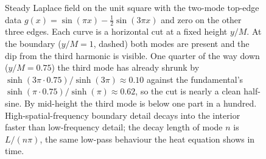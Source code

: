 \begin{figure}[htbp]
\centering
{}
\caption[Two-mode Laplace boundary penetration]{Steady Laplace field
on the unit square with the two-mode top-edge data $g(x) = \sin(\pi
x) - \tfrac{1}{2}\sin(3\pi x)$ and zero on the other three edges.
Each curve is a horizontal cut at a fixed height $y/M$. At the
boundary ($y/M = 1$, dashed) both modes are present and the dip from
the third harmonic is visible. One quarter of the way down ($y/M =
0.75$) the third mode has already shrunk by $\sinh(3\pi\cdot
0.75)/\sinh(3\pi) \approx 0.10$ against the fundamental's
$\sinh(\pi\cdot 0.75)/\sinh(\pi) \approx 0.62$, so the cut is nearly
a clean half-sine. By mid-height the third mode is below one part in
a hundred. High-spatial-frequency boundary detail decays into the
interior faster than low-frequency detail; the decay length of mode
$n$ is $L/(n\pi)$, the same low-pass behaviour the heat equation
shows in time.}
\label{fig:vol02:ch12:laplace-twomode}
\end{figure}
